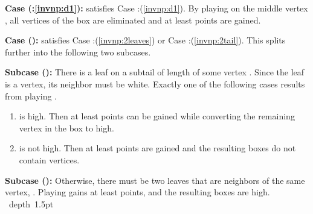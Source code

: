 \documentclass[11pt]{article}
\def\blackslug{\hbox{\hskip 1pt \vrule width 4pt height 8pt
    depth 1.5pt \hskip 1pt}}
\def\QED{\quad\blackslug\lower 8.5pt\null\par}
\def\dnsitem{\vspace{-7pt}\item}
\theoremstyle{definition}
\begin{document}
\smallskip
\par\noindent
{\bf Case (:\ref{invnp:d1}):}
 satisfies Case :(\ref{invnp:d1}). 
By playing on the middle vertex , 
all vertices of the box are eliminated and at least  points are gained.

\bigskip
\par\noindent
{\bf Case ():}
 satisfies Case :(\ref{invnp:2leaves}) or Case :(\ref{invnp:2tail}).
This splits further into the following two subcases.

\smallskip
\par\noindent
{\bf Subcase ():}
	There is a  leaf on a subtail of length  of some vertex . Since the leaf is a  vertex, its neighbor must be white.
	Exactly one of the following cases results from playing .
	\begin{enumerate}
		\dnsitem  is high. Then at least  points can be gained while converting the remaining  vertex in the box to high.
		\dnsitem  is not high. Then at least  points are gained and the resulting boxes do not contain  vertices.
	\end{enumerate}

\par\noindent
{\bf Subcase ():}
	Otherwise, there must be two  leaves that are neighbors of the same vertex, .
	Playing  gains at least  points, and the resulting boxes are high.
\QED
\end{document}
